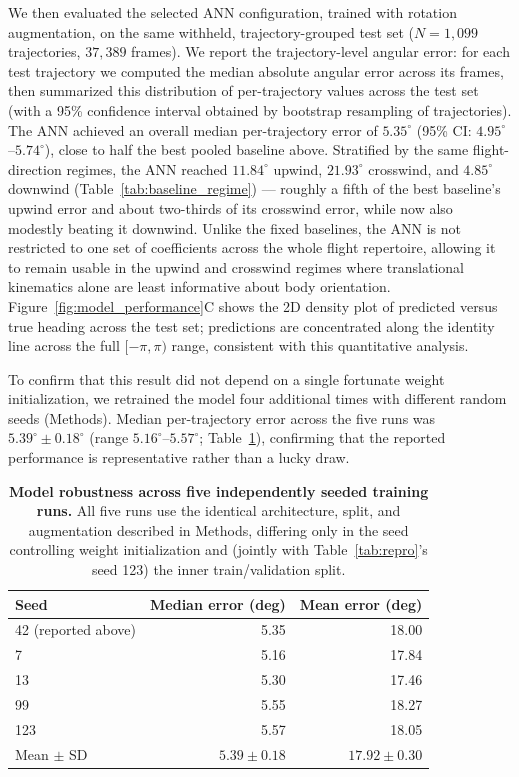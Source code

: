 \documentclass[11pt]{article}
\begin{document}
We then evaluated the selected ANN configuration, trained with rotation augmentation, on the same withheld, trajectory-grouped test set ($N = 1{,}099$ trajectories, $37{,}389$ frames). We report the trajectory-level angular error: for each test trajectory we computed the median absolute angular error across its frames, then summarized this distribution of per-trajectory values across the test set (with a 95\% confidence interval obtained by bootstrap resampling of trajectories). The ANN achieved an overall median per-trajectory error of $5.35^\circ$ (95\% CI: $4.95^\circ$--$5.74^\circ$), close to half the best pooled baseline above. Stratified by the same flight-direction regimes, the ANN reached $11.84^\circ$ upwind, $21.93^\circ$ crosswind, and $4.85^\circ$ downwind (Table~\ref{tab:baseline_regime}) --- roughly a fifth of the best baseline's upwind error and about two-thirds of its crosswind error, while now also modestly beating it downwind. Unlike the fixed baselines, the ANN is not restricted to one set of coefficients across the whole flight repertoire, allowing it to remain usable in the upwind and crosswind regimes where translational kinematics alone are least informative about body orientation. Figure~\ref{fig:model_performance}C shows the 2D density plot of predicted versus true heading across the test set; predictions are concentrated along the identity line across the full $[-\pi, \pi)$ range, consistent with this quantitative analysis.

To confirm that this result did not depend on a single fortunate weight initialization, we retrained the model four additional times with different random seeds (Methods). Median per-trajectory error across the five runs was $5.39^\circ \pm 0.18^\circ$ (range $5.16^\circ$--$5.57^\circ$; Table~\ref{tab:multiseed}), confirming that the reported performance is representative rather than a lucky draw.

\begin{table}[h!]
    \centering
    \caption{\textbf{Model robustness across five independently seeded training runs.} All five runs use the identical architecture, split, and augmentation described in Methods, differing only in the seed controlling weight initialization and (jointly with Table~\ref{tab:repro}'s seed 123) the inner train/validation split.}
    \begin{tabular}{@{}lrr@{}}
        \toprule
        Seed & Median error (deg) & Mean error (deg) \\
        \midrule
        42 (reported above) & 5.35 & 18.00 \\
        7 & 5.16 & 17.84 \\
        13 & 5.30 & 17.46 \\
        99 & 5.55 & 18.27 \\
        123 & 5.57 & 18.05 \\
        \midrule
        Mean $\pm$ SD & $5.39 \pm 0.18$ & $17.92 \pm 0.30$ \\
        \bottomrule
    \end{tabular}
    \label{tab:multiseed}
\end{table}
\end{document}
